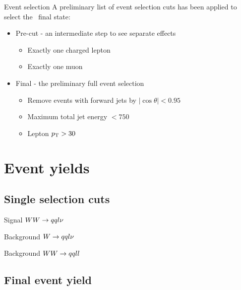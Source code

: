 \documentclass{beamer}
\newcommand{\texpath}{../analysis/tex/}
\begin{document}
\begin{frame}{Event selection}
A preliminary list of event selection cuts has been applied to select the \qqln\ final state:
\begin{itemize}
%
\item Pre-cut - an intermediate step to see separate effects
\begin{itemize}
\item Exactly one charged lepton
\item Exactly one muon
\end{itemize}
%
\item Final - the preliminary full event selection
\begin{itemize}
\item Remove events with forward jets by $|\cos \theta| < 0.95$
\item Maximum total jet energy $< 750$~\GeV
\item Lepton $p_\mathrm{T} > 30$~\GeV
\end{itemize}
%
\end{itemize}
\end{frame}









\section{Event yields}

\subsection{Single selection cuts}

\begin{frame}{Signal $WW\rightarrow qql\nu$}

\end{frame}

\begin{frame}{Background $W\rightarrow qql\nu$}

\end{frame}

\begin{frame}{Background $WW\rightarrow qqll$}

\end{frame}

\subsection{Final event yield}
\end{document}

